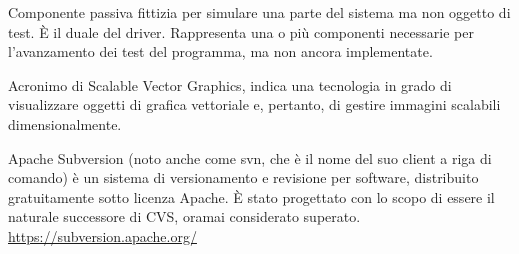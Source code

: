 Componente passiva fittizia per simulare una parte del sistema ma non oggetto di test. \`{E} il duale del driver. Rappresenta una o più componenti necessarie per l’avanzamento dei test del programma, ma non ancora implementate.

Acronimo di Scalable Vector Graphics, indica una tecnologia in grado di visualizzare oggetti di grafica vettoriale e, pertanto, di gestire immagini scalabili dimensionalmente.

Apache Subversion (noto anche come svn, che è il nome del suo client a riga di comando) è un sistema di versionamento e revisione per software, distribuito gratuitamente sotto licenza Apache. \`{E} stato progettato con lo scopo di essere il naturale successore di CVS, oramai considerato superato.\\
\url{https://subversion.apache.org/}
\clearpage